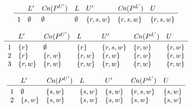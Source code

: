 \documentclass{article}
\begin{document}
\[
\begin{array}{c@{\hspace{10pt}}llllll}
& L' & \mathit{Cn}(P^{U'}) & L
& U' & \mathit{Cn}(P^{L'}) & U \\\hline\\[-3mm]
1 & \emptyset & \emptyset & \emptyset & \{r,s,w\} & \{r,s,w\} & \{r,s,w\} \\ 
\end{array}
\]

\[
\begin{array}{c@{\hspace{10pt}}llllll}
& L' & \mathit{Cn}(P^{U'}) & L
& U' & \mathit{Cn}(P^{L'}) & U \\\hline\\[-3mm]
1 & \{r\} & \emptyset & \{r\} & \{r,s,w\} & \{r,w\} & \{r,w\} \\ 
2 & \{r\} & \{r,w\} & \{r,w\} & \{r,w\} & \{r,w\} & \{r,w\} \\ 
3 & \{r,w\} & \{r,w\} & \{r,w\} & \{r,w\} & \{r,w\} & \{r,w\} \\ 
\end{array}
\]

\[
\begin{array}{c@{\hspace{10pt}}llllll}
& L' & \mathit{Cn}(P^{U'}) & L
& U' & \mathit{Cn}(P^{L'}) & U \\\hline\\[-3mm]
1 & \emptyset & \{s,w\} & \{s,w\} & \{s,w\} & \{r,s,w\} & \{s,w\} \\ 
2 & \{s,w\} & \{s,w\} & \{s,w\} & \{s,w\} & \{s,w\} & \{s,w\} \\ 
\end{array}
\]
\end{document}

